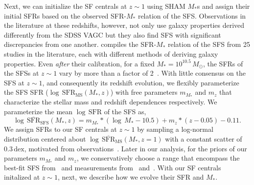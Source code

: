 \documentclass[12pt, letterpaper, preprint]{aastex}
\newcommand{\beq}{\begin{equation}}
\newcommand{\eeq}{\end{equation}}
\begin{document}
Next, we can initialize the SF centrals at $z\sim1$ using SHAM $M_*$s and 
assign their initial SFRs based on the observed SFR-$M_*$ relation of the SFS. 
Observations in the literature at these redshifts, however, not only use 
galaxy properties derived differently from the SDSS VAGC but they also 
find SFS with significant discrepancies from one another. \cite{speagle2014} 
compiles the SFR-$M_*$ relation of the SFS from 25 studies in the literature, 
each with different methods of deriving galaxy properties. Even \emph{after} 
their calibration, for a fixed $M_* = 10^{10.5}\, M_\odot$, the SFRs of the 
SFSs at $z \sim 1$ vary by more than a factor of 2~\citep[see Figure 2 of][]{speagle2014}. 
With little consensus on the SFS at $z\sim1$, and consequently its redshift
evolution, we flexibly parameterize the SFS SFR ($\log\,\mathrm{SFR}_\mathrm{MS}(M_*, z)$) 
with free parameters $m_{M_*}$ and $m_z$ that characterize the stellar mass 
and redshift dependences respectively.  %
We parameterize the mean $\log\,\mathrm{SFR}$ of the SFS as, 
\beq \label{eq:logsfr_ms}
\log\,\overline{\mathrm{SFR}}_\mathrm{SFS}(M_*, z) =  m_{M_*} * (\log\,M_* - 10.5) + m_z * (z - 0.05) - 0.11.
\eeq
We assign SFRs to our SF centrals at $z\sim1$ by sampling a log-normal 
distribution centered about $\log\,\overline{\mathrm{SFR}}_\mathrm{MS}(M_*, z=1)$ 
with a constant scatter of $0.3\,\mathrm{dex}$, motivated from 
observations~\citep{daddi2007, noeske2007, magdis2012, whitaker2012}.
Later in our analysis, for the priors of our parameters $m_{M_*}$ 
and $m_z$, we conservatively choose a range that encompass the best-fit 
SFS from~\cite{speagle2014} and measurements from~\cite{moustakas2013} 
and~\cite{lee2015}. With our SF centrals initalized at $z \sim 1$, next, 
we describe how we evolve their SFR and $M_*$.
\end{document}
